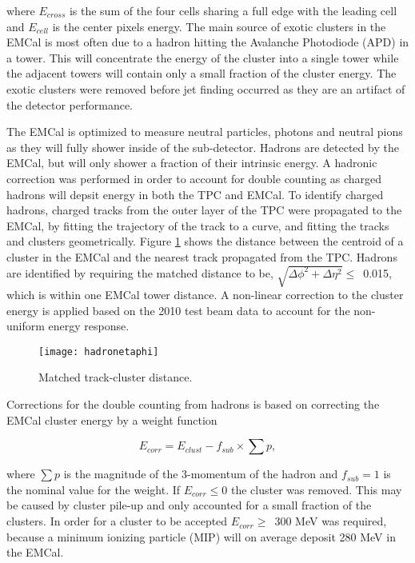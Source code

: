 \noindent
where $E_{cross}$ is the sum of the four cells sharing a full edge with the leading cell and $E_{cell}$ is the center pixels energy.  The main source of exotic clusters in the EMCal is most often due to a hadron hitting the Avalanche Photodiode (APD) in a tower.  This will concentrate the energy of the cluster into a single tower while the adjacent towers will contain only a small fraction of the cluster energy.  The exotic clusters were removed before jet finding occurred as they are an artifact of the detector performance.

The EMCal is optimized to measure neutral particles, photons and neutral pions as they will fully shower inside of the sub-detector.  Hadrons are detected by the EMCal, but will only shower a fraction of their intrinsic energy.  A hadronic correction was performed in order to account for double counting as charged hadrons will depsit energy in both the TPC and EMCal.  To identify charged hadrons, charged tracks from the outer layer of the TPC were propagated to the EMCal, by fitting the trajectory of the track to a curve, and fitting the tracks and clusters geometrically.  Figure \ref{fig:EMChadetaphi} shows the distance between the centroid of a cluster in the EMCal and the nearest track propagated from the TPC.  Hadrons are identified by requiring the matched distance to be, $\sqrt{ \Delta\phi^{2} + \Delta\eta^{2} } \leq \,$ 0.015, which is within one EMCal tower distance.  A non-linear correction to the cluster energy is applied based on the 2010 test beam data to account for the non-uniform energy response.

\begin{figure}[h]
\texttt{[image: hadronetaphi]}
\centering
\caption{Matched track-cluster distance.}
\label{fig:EMChadetaphi}
\end{figure}


Corrections for the double counting from hadrons is based on correcting the EMCal cluster energy by a weight function

\begin{equation}
E_{corr} = E_{clust} - f_{sub} \times \sum p ,
\label{eq:HadCorr}
\end{equation}

\noindent
where $\sum p$ is the magnitude of the 3-momentum of the hadron and $f_{sub} = 1$ is the nominal value for the weight.  If $E_{corr} \leq 0$ the cluster was removed.  This may be caused by cluster pile-up and only accounted for a small fraction of the clusters.  In order for a cluster to be accepted $E_{corr} \geq \,$ 300 MeV was required, because a minimum ionizing particle (MIP) will on average deposit 280 MeV in the EMCal.  

